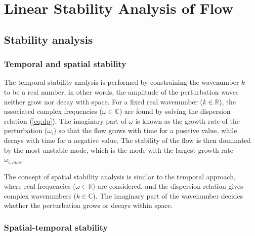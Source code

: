 
\chapter{Linear Stability Analysis of Flow}

\section{Stability analysis}
\subsection{Temporal and spatial stability}
The temporal stability analysis is performed by constraining the wavenumber $k$ to be a real number, in other words, the amplitude of the perturbation waves neither grow nor decay with space. For a fixed real wavenumber ($k\in\mathbb{R}$), the associated complex frequencies ($\omega\in\mathbb{C}$) are found by solving the dispersion relation (\ref{eq:dp}). The imaginary part of $\omega$ is known as the growth rate of the perturbation ($\omega_i$) so that the flow grows with time for a positive value, while decays with time for a negative value. The stability of the flow is then dominated by the most unstable mode, which is the mode with the largest growth rate $\omega_{i, max}$.

The concept of spatial stability analysis is similar to the temporal approach, where real frequencies ($\omega\in\mathbb{R}$) are considered, and the dispersion relation gives complex wavenumbers ($k\in\mathbb{C}$). The imaginary part of the wavenumber decides whether the perturbation grows or decays within space.

\subsection{Spatial-temporal stability}

